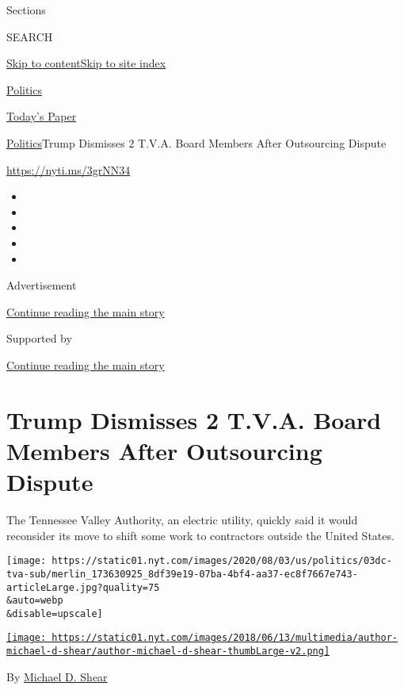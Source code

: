 Sections

SEARCH

\protect\hyperlink{site-content}{Skip to
content}\protect\hyperlink{site-index}{Skip to site index}

\href{https://www.nytimes.com/section/politics}{Politics}

\href{https://myaccount.nytimes.com/auth/login?response_type=cookie\&client_id=vi}{}

\href{https://www.nytimes.com/section/todayspaper}{Today's Paper}

\href{/section/politics}{Politics}\textbar{}Trump Dismisses 2 T.V.A.
Board Members After Outsourcing Dispute

\url{https://nyti.ms/3grNN34}

\begin{itemize}
\item
\item
\item
\item
\item
\end{itemize}

Advertisement

\protect\hyperlink{after-top}{Continue reading the main story}

Supported by

\protect\hyperlink{after-sponsor}{Continue reading the main story}

\hypertarget{trump-dismisses-2-tva-board-members-after-outsourcing-dispute}{%
\section{Trump Dismisses 2 T.V.A. Board Members After Outsourcing
Dispute}\label{trump-dismisses-2-tva-board-members-after-outsourcing-dispute}}

The Tennessee Valley Authority, an electric utility, quickly said it
would reconsider its move to shift some work to contractors outside the
United States.

\texttt{[image: https://static01.nyt.com/images/2020/08/03/us/politics/03dc-tva-sub/merlin\_173630925\_8df39e19-07ba-4bf4-aa37-ec8f7667e743-articleLarge.jpg?quality=75\\\&auto=webp\\\&disable=upscale]}

\href{https://www.nytimes.com/by/michael-d-shear}{\texttt{[image: https://static01.nyt.com/images/2018/06/13/multimedia/author-michael-d-shear/author-michael-d-shear-thumbLarge-v2.png]}}

By \href{https://www.nytimes.com/by/michael-d-shear}{Michael D. Shear}

